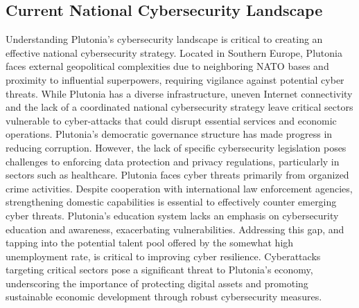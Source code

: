 \documentclass[
	a4paper, %
	10pt, %
]{CSSullivanBusinessReport}
\begin{document}
\begin{fullwidth}
\begin{justify}
\subsection{Current National Cybersecurity Landscape}
Understanding Plutonia's cybersecurity landscape is critical to creating an effective national cybersecurity strategy. Located in Southern Europe, Plutonia faces external geopolitical complexities due to neighboring NATO bases and proximity to influential superpowers, requiring vigilance against potential cyber threats. While Plutonia has a diverse infrastructure, uneven Internet connectivity and the lack of a coordinated national cybersecurity strategy leave critical sectors vulnerable to cyber-attacks that could disrupt essential services and economic operations. Plutonia's democratic governance structure has made progress in reducing corruption. However, the lack of specific cybersecurity legislation poses challenges to enforcing data protection and privacy regulations, particularly in sectors such as healthcare. Plutonia faces cyber threats primarily from organized crime activities. Despite cooperation with international law enforcement agencies, strengthening domestic capabilities is essential to effectively counter emerging cyber threats. Plutonia's education system lacks an emphasis on cybersecurity education and awareness, exacerbating vulnerabilities. Addressing this gap, and tapping into the potential talent pool offered by the somewhat high unemployment rate, is critical to improving cyber resilience. Cyberattacks targeting critical sectors pose a significant threat to Plutonia's economy, underscoring the importance of protecting digital assets and promoting sustainable economic development through robust cybersecurity measures.


\end{justify}
\end{fullwidth}
\end{document}
